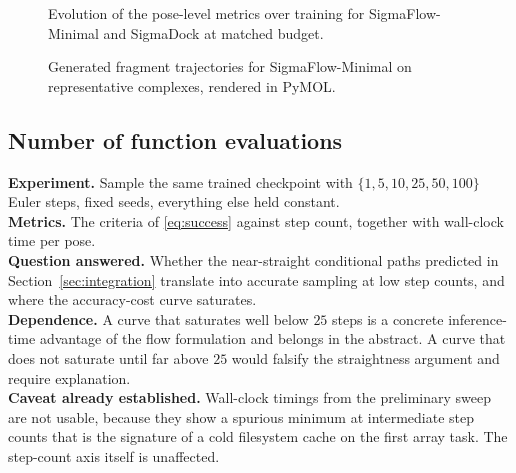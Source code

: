 \documentclass[11pt,a4paper]{report}
\theoremstyle{plain}
\theoremstyle{definition}
\theoremstyle{remark}
\newif\ifdraftmode
\newenvironment{reserved}[1]{%
    \begin{tcolorbox}[
      enhanced, breakable,
      colback=PanelGrey, colframe=DraftBlue,
      boxrule=0.5pt, left=6pt,right=6pt,top=5pt,bottom=5pt,
      fonttitle=\bfseries\small\sffamily,
      title={RESERVED \textendash\ #1}]
      \small\sffamily
  }{%
    \end{tcolorbox}
  }
\newenvironment{reserved}[1]{\setbox0=\vbox\bgroup}{\egroup}
\newcommand{\figplaceholder}[3]{%
  \begin{figure}[htbp]
  \centering
  \ifdraftmode
    \begin{tcolorbox}[
      width=0.92\textwidth, colback=PanelGrey, colframe=DraftGrey,
      boxrule=0.5pt, sharp corners, halign=flush left]
      \small\sffamily
      \textbf{\color{DraftBlue}FIGURE PLACEHOLDER}\\[3pt]
      #3
    \end{tcolorbox}
  \else
    \fbox{\parbox{0.9\textwidth}{\centering\vspace{2cm}[figure]\vspace{2cm}}}
  \fi
  \caption{#2}
  \label{#1}
  \end{figure}}
\begin{document}
\figplaceholder{fig:minimal-curves}
{Evolution of the pose-level metrics over training for SigmaFlow-Minimal and
SigmaDock at matched budget.}
{Three stacked panels sharing an $x$ axis in optimisation steps, with a second
axis in wall-clock hours. Panel 1: median RMSD. Panel 2: fraction with
RMSD $<2$\,\AA. Panel 3: fraction PoseBusters-valid, and the conjunction
\eqref{eq:success} as a separate line. Two colours, one per arm, with bootstrap
bands over complexes. Snapshots from a single annealing schedule are drawn as
curves; separately annealed endpoints are drawn as isolated markers and are
never joined to the curves, because a mid-anneal snapshot is not the model one
would obtain by training to that budget with its own schedule.}

\figplaceholder{fig:minimal-pymol}
{Generated fragment trajectories for SigmaFlow-Minimal on representative
complexes, rendered in PyMOL.}
{A grid of panels, one per selected complex, chosen to span the fragment-count
range of Figure~\ref{fig:fragment-histogram}, for instance one ligand each with
$N = 1$, $3$, $5$ and $8$. In each panel show the protein pocket surface in
light grey, the crystallographic pose in a saturated reference colour, and the
generated pose. Overlay the integration trajectory by drawing the fragment
centroids at every integration step as a fading trace, with each fragment in
its own colour so that the reader can see whether fragments move coherently or
independently. State the number of integration steps in the caption. The point
of the figure is qualitative, namely whether failures look like a
mis-positioned but coherent ligand or like a set of fragments that never
assembled.}

\subsection{Number of function evaluations}
\label{sec:minimal-nfe}

\begin{reserved}{Accuracy against integration steps}
\textbf{Experiment.} Sample the same trained checkpoint with
$\{1, 5, 10, 25, 50, 100\}$ Euler steps, fixed seeds, everything else held
constant.\\
\textbf{Metrics.} The criteria of \eqref{eq:success} against step count,
together with wall-clock time per pose.\\
\textbf{Question answered.} Whether the near-straight conditional paths
predicted in Section~\ref{sec:integration} translate into accurate sampling at
low step counts, and where the accuracy-cost curve saturates.\\
\textbf{Dependence.} A curve that saturates well below $25$ steps is a concrete
inference-time advantage of the flow formulation and belongs in the abstract. A
curve that does not saturate until far above $25$ would falsify the
straightness argument and require explanation.\\
\textbf{Caveat already established.} Wall-clock timings from the preliminary
sweep are not usable, because they show a spurious minimum at intermediate step
counts that is the signature of a cold filesystem cache on the first array
task. The step-count axis itself is unaffected.
\end{reserved}
\end{document}
